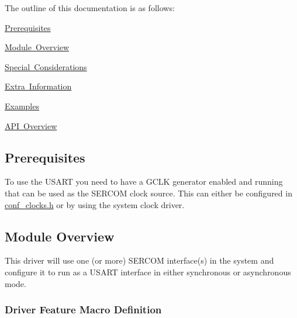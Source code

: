 The outline of this documentation is as follows\+:
\begin{DoxyItemize}
\item \mbox{\hyperlink{group__asfdoc__sam0__sercom__usart__group_asfdoc_sam0_sercom_usart_prerequisites}{Prerequisites}}
\item \mbox{\hyperlink{group__asfdoc__sam0__sercom__usart__group_asfdoc_sam0_sercom_usart_overview}{Module Overview}}
\item \mbox{\hyperlink{group__asfdoc__sam0__sercom__usart__group_asfdoc_sam0_sercom_usart_special_considerations}{Special Considerations}}
\item \mbox{\hyperlink{group__asfdoc__sam0__sercom__usart__group_asfdoc_sam0_sercom_usart_extra_info}{Extra Information}}
\item \mbox{\hyperlink{group__asfdoc__sam0__sercom__usart__group_asfdoc_sam0_sercom_usart_examples}{Examples}}
\item \mbox{\hyperlink{group__asfdoc__sam0__sercom__usart__group_asfdoc_sam0_sercom_usart_api_overview}{A\+PI Overview}}
\end{DoxyItemize}\hypertarget{group__asfdoc__sam0__sercom__usart__group_asfdoc_sam0_sercom_usart_prerequisites}{}\subsection{Prerequisites}\label{group__asfdoc__sam0__sercom__usart__group_asfdoc_sam0_sercom_usart_prerequisites}
To use the U\+S\+A\+RT you need to have a G\+C\+LK generator enabled and running that can be used as the S\+E\+R\+C\+OM clock source. This can either be configured in \mbox{\hyperlink{conf__clocks_8h}{conf\+\_\+clocks.\+h}} or by using the system clock driver.\hypertarget{group__asfdoc__sam0__sercom__usart__group_asfdoc_sam0_sercom_usart_overview}{}\subsection{Module Overview}\label{group__asfdoc__sam0__sercom__usart__group_asfdoc_sam0_sercom_usart_overview}
This driver will use one (or more) S\+E\+R\+C\+OM interface(s) in the system and configure it to run as a U\+S\+A\+RT interface in either synchronous or asynchronous mode.\hypertarget{group__asfdoc__sam0__sercom__usart__group_asfdoc_sam0_sercom_usart_features}{}\subsubsection{Driver Feature Macro Definition}\label{group__asfdoc__sam0__sercom__usart__group_asfdoc_sam0_sercom_usart_features}
